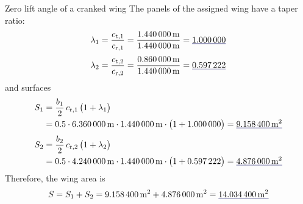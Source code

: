 \documentclass[[12pt,twoside]{book}
\begin{document}
\begin{myExampleX}{Zero lift angle of a cranked wing}{}
The panels of the assigned wing have a taper ratio:
\[
\lambda_1
  =\frac{c_{\mathrm{t},1}}{c_{\mathrm{r},1}}
  =\frac{\SI[round-precision=2]{\myChordTipWingIMT}{\metre}}{\SI[round-precision=2]{\myChordRootWingIMT}{\metre}}
  =\mathunderline{mydarkblue}{ \SI[round-precision=0]{\myTaperRatioWingI}{} }
\]
\[
\lambda_2
  =\frac{c_{\mathrm{t},2}}{c_{\mathrm{r},2}}
  =\frac{\SI[round-precision=2]{\myChordTipWingIIMT}{\metre}}{\SI[round-precision=2]{\myChordRootWingIIMT}{\metre}}
  =\mathunderline{mydarkblue}{ \SI[round-precision=2]{\myTaperRatioWingII}{} }
\]
and surfaces 
\[
\begin{split}
S_1 & {}= \frac{b_1}{2} \, c_{\mathrm{r},1} \, \big( 1 + \lambda_1 \big) \\
  & {}=
    \num{0.5} \cdot \SI[round-precision=1]{\mySpanWingIMT}{\metre}
      \cdot \SI[round-precision=2]{\myChordRootWingIMT}{\metre}
      \cdot \big( 1 + \SI[round-precision=2]{\myTaperRatioWingI}{} \big) 
    = \mathunderline{mydarkblue}{ \SI[round-precision=2]{\myAreaWingIMTsquared}{\metre^2} }
\end{split}
\]
\[
\begin{split}
S_2 & {}= \frac{b_2}{2} \, c_{\mathrm{r},2} \, \big( 1 + \lambda_2 \big) \\
  & {}=
    \num{0.5} \cdot \SI[round-precision=1]{\mySpanWingIIMT}{\metre}
      \cdot \SI[round-precision=2]{\myChordRootWingIIMT}{\metre}
      \cdot \big( 1 + \SI[round-precision=2]{\myTaperRatioWingII}{} \big) 
    = \mathunderline{mydarkblue}{ \SI[round-precision=2]{\myAreaWingIIMTsquared}{\metre^2} }
\end{split}
\]
Therefore, the wing area is
\[
\begin{split}
S = S_1 + S_2 
  = \SI[round-precision=2]{\myAreaWingIMTsquared}{\metre^2}
    + \SI[round-precision=2]{\myAreaWingIIMTsquared}{\metre^2}
  = \mathunderline{mydarkblue}{ \SI[round-precision=2]{\myAreaWingMTsquared}{\metre^2} }
\end{split}
\]


\end{myExampleX}
\end{document}

